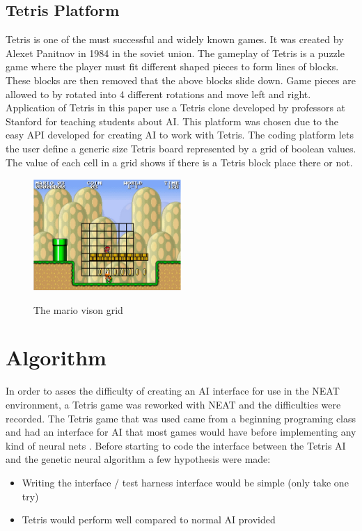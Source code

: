 \documentclass[12pt]{ucthesis} \newif\ifpdf \ifx\pdfoutput\undefined
\begin{document}
\section{Tetris Platform}

Tetris is one of the must successful and widely known games. It was created by
Alexet Panitnov in 1984 in the soviet union. The gameplay of Tetris is a puzzle
game where the player must fit different shaped pieces to form lines of blocks.
These blocks are then removed that the above blocks slide down. Game pieces are
allowed to by rotated into 4 different rotations and move left and right.
Application of Tetris in this paper use a Tetris clone developed by professors
at Stanford for teaching students about AI. This platform was chosen due to the
easy API developed for creating AI to work with Tetris. The coding platform lets
the user define a generic size Tetris board represented by a grid of boolean
values. The value of each cell in a grid shows if there is a Tetris block place
there or not.

\begin{figure}[h!] 
\caption{The mario vison grid}
  \centering
    \includegraphics[width=0.5\textwidth]{mariogrid.png}
   \label{fig:mariogrid} 
\end{figure}

\chapter{Algorithm}

In order to asses the difficulty of creating an AI interface for use in the NEAT
environment, a Tetris game was reworked with NEAT and the difficulties were
recorded. The Tetris game that was used came from a beginning programing class
and had an interface for AI that most games would have before implementing any
kind of neural nets \cite{tetris}. Before starting to code the interface between
the Tetris AI and the genetic neural algorithm a few hypothesis were made:

\begin{itemize}
\renewcommand{\labelitemi}{$\bullet$}
\item Writing the interface / test harness interface would be simple (only take one
try) 
\item Tetris would perform well compared to normal AI provided
\end{itemize}
\end{document}

